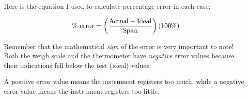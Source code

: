 





Here is the equation I used to calculate percentage error in each case:

$$\hbox{\% error} = \left({\hbox{Actual} - \hbox{Ideal} \over \hbox{Span}}\right) (100 \%)$$

Remember that the mathematical {\it sign} of the error is very important to note!  Both the weigh scale and the thermometer have {\it negative} error values because their indications fell below the test (ideal) values.

A positive error value means the instrument registers too much, while a negative error value means the instrument registers too little.




